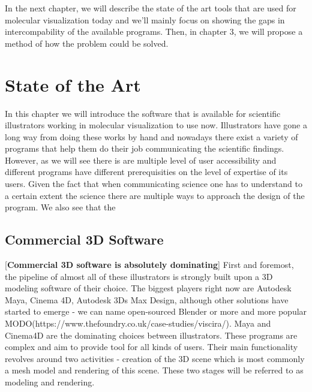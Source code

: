 \documentclass[
  digital, %
  table,   %
  nolof,     %
  nolot,     %
]{fithesis3}
\begin{document}
In the next chapter, we will describe the state of the art tools that are used for molecular visualization today and we'll mainly focus on showing the gaps in intercompability of the available programs. Then, in chapter 3, we will propose a method of how the problem could be solved.

\chapter{State of the Art}

In this chapter we will introduce the software that is available for scientific illustrators working in molecular visualization to use now. Illustrators have gone a long way from doing these works by hand and nowadays there exist a variety of programs that help them do their job communicating the scientific findings. However, as we will see there is are multiple level of user accessibility and different programs have different prerequisities on the level of expertise of its users. Given the fact that when communicating science one has to understand to a certain extent the science there are multiple ways to approach the design of the program. We also see that the

\section{Commercial 3D Software}
[\textbf{Commercial 3D software is absolutely dominating}]
First and foremost, the pipeline of almost all of these illustrators is strongly built upon a 3D modeling software of their choice. The biggest players right now are Autodesk Maya, Cinema 4D, Autodesk 3Ds Max Design, although other solutions have started to emerge - we can name open-sourced Blender or more and more popular MODO(https://www.thefoundry.co.uk/case-studies/viscira/). Maya and Cinema4D are the dominating choices between illustrators. These programs are complex and aim to provide tool for all kinds of users. Their main functionality revolves around two activities - creation of the 3D scene which is most commonly a mesh model and rendering of this scene. These two stages will be referred to as modeling and rendering.
\end{document}
